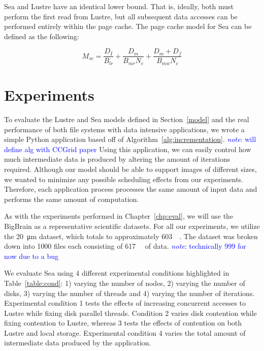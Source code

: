 \documentclass{report}
\newcommand{\note}[1]{\textcolor{blue}{\textit{note}: #1}}
\begin{document}
    Sea and Lustre have an identical lower bound. That is, ideally, both must
    perform the first read from Lustre, but all subsequent data accesses can
    be performed entirely within the page cache. The page cache model for Sea
    can be defined as the following:

    \begin{equation}\label{eq:msc}
        M_{sc} = \frac{D_{I}}{B_{lr}} + \frac{D_{m}}{B_{mr}N_{c}} + \frac{D_{m} + D_{f}}{B_{mw}N_{c}}
    \end{equation}

    \section{Experiments}\label{exp}
    To evaluate the Lustre and Sea models defined in Section~\ref{model} and the real
    performance of both file systems with data intensive applications, we wrote a simple
    Python application based off of Algorithm~\ref{alg:incrementation}. \note{will define alg with CCGrid paper}
    Using this application, we can easily control how much intermediate data is produced
    by altering the amount of iterations required. Although our model should be able
    to support images of different sizes, we wanted to minimize any possible
    scheduling effects from our experiments. Therefore, each application process
    processes the same amount of input data and performs the same amount of computation.

    As with the experiments performed in Chapter~\ref{chp:eval}, we will use the BigBrain
    as a representative scientific datasets. For all our experiments, we utilize the
    \SI{20}{\micro\meter} dataset, which totals to approximately \SI{603}{\gibi\byte}.
    The dataset was broken down into 1000 files each consisting of \SI{617}{\mebi\byte}
    of data. \note{technically 999 for now due to a bug}

    We evaluate Sea using 4 different experimental conditions highlighted in Table~\ref{table:cond}:
    1) varying the number of nodes, 2) varying the number of disks, 3) varying the number of threads and 4)
    varying the number of iterations. Experimental condition 1 tests the effects
    of increasing concurrent accesses to Lustre while fixing disk parallel threads. Condition 2
    varies disk contention while fixing contention to Lustre, whereas 3 tests the effects
    of contention on both Lustre and local storage. Experimental condition
    4 varies the total amount of intermediate data produced by the application.
    
\end{document}
